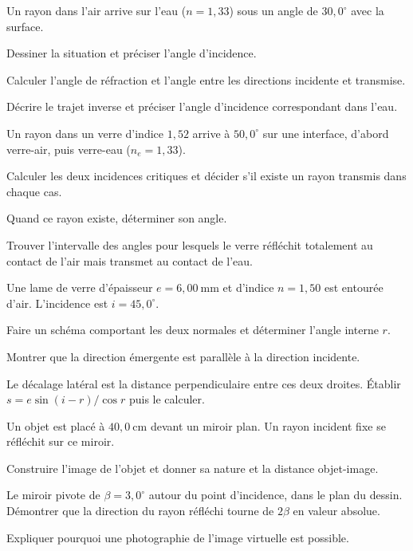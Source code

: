 Un rayon dans l'air arrive sur l'eau ($n=1{,}33$) sous un angle de $30{,}0^\circ$ avec la surface.
\begin{questions}
\item Dessiner la situation et préciser l'angle d'incidence.
\item Calculer l'angle de réfraction et l'angle entre les directions incidente et transmise.
\item Décrire le trajet inverse et préciser l'angle d'incidence correspondant dans l'eau.
\end{questions}
Un rayon dans un verre d'indice $1{,}52$ arrive à $50{,}0^\circ$ sur une interface, d'abord verre-air, puis verre-eau ($n_e=1{,}33$).
\begin{questions}
\item Calculer les deux incidences critiques et décider s'il existe un rayon transmis dans chaque cas.
\item Quand ce rayon existe, déterminer son angle.
\item Trouver l'intervalle des angles pour lesquels le verre réfléchit totalement au contact de l'air mais transmet au contact de l'eau.
\end{questions}
Une lame de verre d'épaisseur $e=6{,}00\ \mathrm{mm}$ et d'indice $n=1{,}50$ est entourée d'air. L'incidence est $i=45{,}0^\circ$.
\begin{questions}
\item Faire un schéma comportant les deux normales et déterminer l'angle interne $r$.
\item Montrer que la direction émergente est parallèle à la direction incidente.
\item Le décalage latéral est la distance perpendiculaire entre ces deux droites. Établir $s=e\sin(i-r)/\cos r$ puis le calculer.
\end{questions}
Un objet est placé à $40{,}0\ \mathrm{cm}$ devant un miroir plan. Un rayon incident fixe se réfléchit sur ce miroir.
\begin{questions}
\item Construire l'image de l'objet et donner sa nature et la distance objet-image.
\item Le miroir pivote de $\beta=3{,}0^\circ$ autour du point d'incidence, dans le plan du dessin. Démontrer que la direction du rayon réfléchi tourne de $2\beta$ en valeur absolue.
\item Expliquer pourquoi une photographie de l'image virtuelle est possible.
\end{questions}
